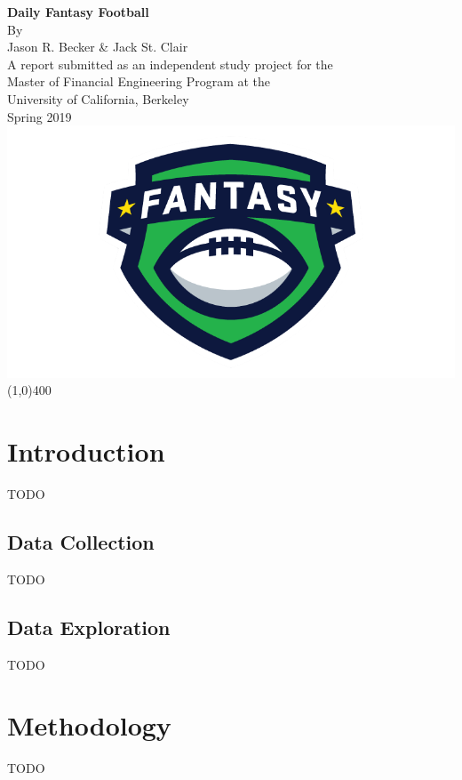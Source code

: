 \documentclass[12pt]{article}
\begin{document}
\begin{titlepage}
	\begin{center}
	\vspace*{4cm}
	\huge{\textbf{Daily Fantasy Football}}\\[2cm]
	\Large{By\\[2mm] Jason R. Becker \& Jack St. Clair}\\[2cm]
	\large{A report submitted as an independent study project for the\\
		Master of Financial Engineering Program at the\\
		 University of California, Berkeley}\\[1cm]	
	\Large{Spring 2019}\\[2cm]
	\includegraphics[scale=0.3]{../figures/fantasy_logo}
	\vfill
	\line(1,0){400}
	\end{center}
\end{titlepage}


\section{Introduction}
TODO



\pagebreak
\subsection{Data Collection}
TODO

\subsection{Data Exploration}
TODO

\pagebreak
\section{Methodology}
TODO
\end{document}
